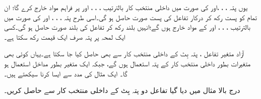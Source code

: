 یوں پتہ ، ، ،اور  کی صورت میں داخلی منتخب کار بالترتیب ، ، ، اور  پر فراہم مواد خارج کرے گا؛ ان تمام کو پست رکھ کر درکار تفاعل کی پست صورت حاصل ہو گی۔اسی طرح پتہ ، ، ، اور  کی صورت میں بالترتیب ، ، ، اور  کے مواد خارج ہوں گے؛انہیں بلند رکھ کر تفاعل کی بلند صورت حاصل ہو گی۔کسی ایک لمحہ پر پتہ صرف ایک قیمت رکھ سکتا ہے۔

  آزاد متغیر تفاعل ، پتہ بِٹ کے داخلی منتخب کار سے بھی حاصل کیا جا سکتا ہے۔یہاں کوئی بھی  متغیرات بطور داخلی منتخب کار کے پتہ استعمال ہوں گے، جبکہ ایک متغیر بطور مداخل استعمال ہو گا۔ ایک مثال کی مدد سے ایسا کرنا سیکھتے ہیں۔


 درج بالا مثال میں دیا گیا تفاعل  دو پتہ بِٹ کے  داخلی منتخب کار سے حاصل کریں۔

